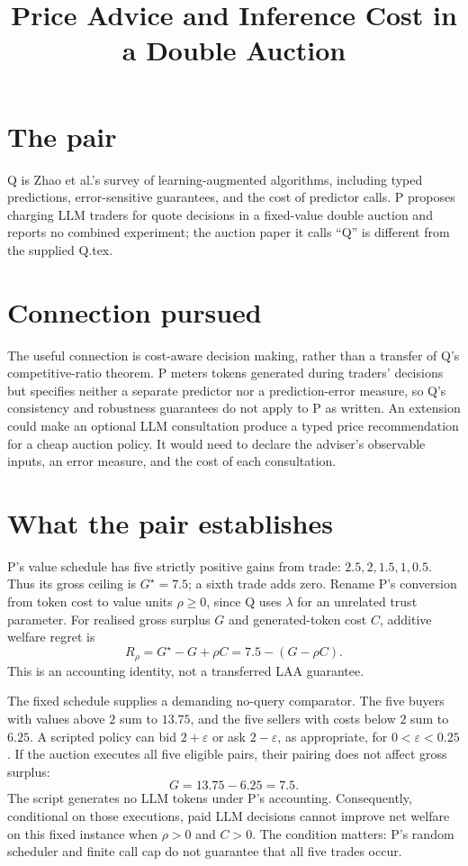 \documentclass{article}
\title{Price Advice and Inference Cost in a Double Auction}
\begin{document}
\maketitle

\section{The pair}

Q is Zhao et al.'s survey of learning-augmented algorithms, including typed predictions, error-sensitive guarantees, and the cost of predictor calls. P proposes charging LLM traders for quote decisions in a fixed-value double auction and reports no combined experiment; the auction paper it calls ``Q'' is different from the supplied Q.tex. 

\section{Connection pursued}

The useful connection is cost-aware decision making, rather than a transfer of Q's competitive-ratio theorem. P meters tokens generated during traders' decisions but specifies neither a separate predictor nor a prediction-error measure, so Q's consistency and robustness guarantees do not apply to P as written. An extension could make an optional LLM consultation produce a typed price recommendation for a cheap auction policy. It would need to declare the adviser's observable inputs, an error measure, and the cost of each consultation. 

\section{What the pair establishes}

P's value schedule has five strictly positive gains from trade: \(2.5,2,1.5,1,0.5\). Thus its gross ceiling is \(G^{\star}=7.5\); a sixth trade adds zero. Rename P's conversion from token cost to value units \(\rho\geq0\), since Q uses \(\lambda\) for an unrelated trust parameter. For realised gross surplus \(G\) and generated-token cost \(C\), additive welfare regret is
\[
R_{\rho}=G^{\star}-G+\rho C=7.5-(G-\rho C).
\]
This is an accounting identity, not a transferred LAA guarantee. 

The fixed schedule supplies a demanding no-query comparator. The five buyers with values above \(2\) sum to \(13.75\), and the five sellers with costs below \(2\) sum to \(6.25\). A scripted policy can bid \(2+\varepsilon\) or ask \(2-\varepsilon\), as appropriate, for \(0<\varepsilon<0.25\). If the auction executes all five eligible pairs, their pairing does not affect gross surplus:
\[
G=13.75-6.25=7.5.
\]
The script generates no LLM tokens under P's accounting. Consequently, conditional on those executions, paid LLM decisions cannot improve net welfare on this fixed instance when \(\rho>0\) and \(C>0\). The condition matters: P's random scheduler and finite call cap do not guarantee that all five trades occur. 
\end{document}
